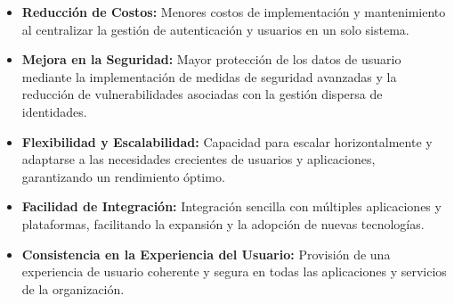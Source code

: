 \begin{itemize}
    \item \textbf{Reducción de Costos:} Menores costos de implementación y mantenimiento al centralizar la gestión de autenticación y usuarios en un solo sistema.
    \item \textbf{Mejora en la Seguridad:} Mayor protección de los datos de usuario mediante la implementación de medidas de seguridad avanzadas y la reducción de vulnerabilidades asociadas con la gestión dispersa de identidades.
    \item \textbf{Flexibilidad y Escalabilidad:} Capacidad para escalar horizontalmente y adaptarse a las necesidades crecientes de usuarios y aplicaciones, garantizando un rendimiento óptimo.
    \item \textbf{Facilidad de Integración:} Integración sencilla con múltiples aplicaciones y plataformas, facilitando la expansión y la adopción de nuevas tecnologías.
    \item \textbf{Consistencia en la Experiencia del Usuario:} Provisión de una experiencia de usuario coherente y segura en todas las aplicaciones y servicios de la organización.
\end{itemize}

